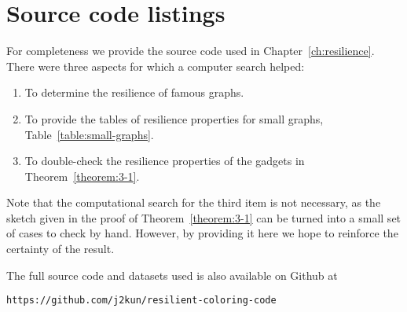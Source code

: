 \chapter{Source code listings}
\label{appendix:resilience}

For completeness we provide the source code used in
Chapter~\ref{ch:resilience}. There were three aspects for which a computer
search helped:

\begin{enumerate}
   \item To determine the resilience of famous graphs.
   \item To provide the tables of resilience properties for small graphs,
Table~\ref{table:small-graphs}.
   \item To double-check the resilience properties of the gadgets in
Theorem~\ref{theorem:3-1}.
\end{enumerate}

Note that the computational search for the third item is not necessary, as the
sketch given in the proof of Theorem~\ref{theorem:3-1} can be turned into a
small set of cases to check by hand. However, by providing it here we hope to
reinforce the certainty of the result.

The full source code and datasets used is also available on Github at 

\begin{centering}
\texttt{https://github.com/j2kun/resilient-coloring-code}
\end{centering}

